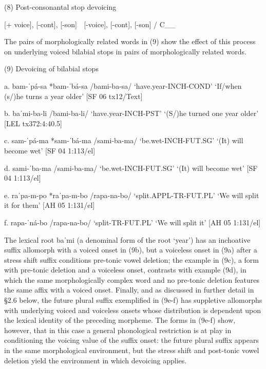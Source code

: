 (8)	Post-consonantal stop devoicing

	[+ voice], [-cont], [-son]      [-voice], [-cont], [-son]   / C\_\_

The pairs of morphologically related words in (9) show the effect of this process on underlying voiced bilabial stops in pairs of morphologically related words.

(9)	Devoicing of bilabial stops

a.	bam-ˈpá-sa				*bam-ˈbá-sa
	/bami-ba-sa/
	‘have.year-INCH-COND’
	‘If/when (s/)he turns a year older’
	[SF 06 tx12/Text]

b.	baˈmi-ba-li
 	/bami-ba-li/
	‘have.year-INCH-PST’
	‘(S/)he turned one year older’
	[LEL tx372:4:40.5]

c.	sam-ˈpá-ma				*sam-ˈbá-ma
	/sami-ba-ma/
	‘be.wet-INCH-FUT.SG’
	‘(It) will become wet’
	[SF 04 1:113/el]

d.	sami-ˈba-ma
	/sami-ba-ma/
	‘be.wet-INCH-FUT.SG’
	‘(It) will become wet’
	[SF 04 1:113/el]

e.	raˈpa-m-po				*raˈpa-m-bo
	/rapa-na-bo/
	‘split.APPL-TR-FUT.PL’
	‘We will split it for them’
	[AH 05 1:131/el]

f.	rapa-ˈná-bo
	/rapa-na-bo/
	‘split-TR-FUT.PL’
	‘We will split it’
	[AH 05 1:131/el]

The lexical root baˈmi (a denominal form of the root ‘year’) has an inchoative suffix allomorph with a voiced onset in (9b), but a voiceless onset in (9a) after a stress shift suffix conditions pre-tonic vowel deletion; the example in (9c), a form with pre-tonic deletion and a voiceless onset, contrasts with example (9d), in which the same morphologically complex word and no pre-tonic deletion features the same affix with a voiced onset. Finally, and as discussed in further detail in §2.6 below, the future plural suffix exemplified in (9e-f) has suppletive allomorphs with underlying voiced and voiceless onsets whose distribution is dependent upon the lexical identity of the preceding morpheme. The forms in (9e-f) show, however, that in this case a general phonological restriction is at play in conditioning the voicing value of the suffix onset: the future plural suffix appears in the same morphological environment, but the stress shift and post-tonic vowel deletion yield the environment in which devoicing applies.

